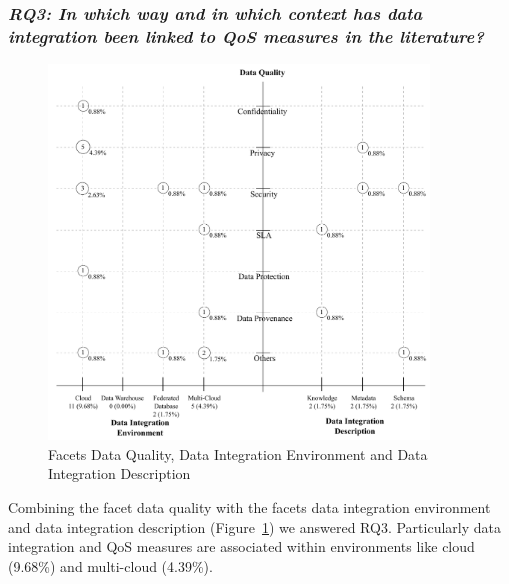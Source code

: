 \subsubsection{\textit{RQ3:  In which way and in which context has data integration been linked to QoS measures in the literature?}}
\begin{figure}[!h]
\centering
\includegraphics[width=0.90\textwidth]{figs/bubble-charts/Data-Quality-DI.pdf}
\caption{Facets Data Quality, Data Integration Environment and Data Integration Description}\label{fig:facet4}
\end{figure}

Combining the facet data quality with the facets data integration environment and data integration description
(Figure~\ref{fig:facet4}) we answered RQ3. Particularly data integration and QoS measures are associated within environments like cloud  (9.68\%) and multi-cloud (4.39\%).

